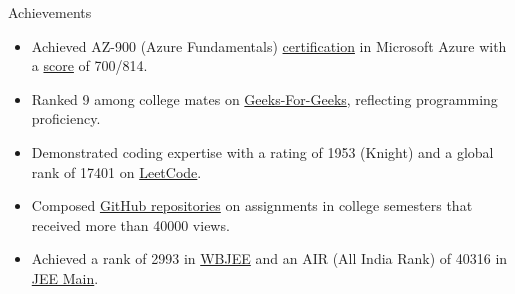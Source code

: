 \documentclass{resume} %
\begin{document}
\begin{rSection}{Achievements} 
\begin{itemize}
\setlength\itemsep{-1.75em} %
     \item Achieved AZ-900 (Azure Fundamentals) \href{https://learn.microsoft.com/en-in/users/arkapratimghosh-4932/credentials/certification-o-/azure-fundamentals}{certification} in Microsoft Azure with a \href{https://drive.google.com/file/d/1s7vbb-FW7VGSNXz2BCDkJnFmuanPQLEC/view}{score} of 700/814. \\
    \item   Ranked 9 among college mates on \href{https://www.geeksforgeeks.org/user/arkapratimghosh20021/?utm_source=geeksforgeeks&utm_medium=my_profile&utm_campaign=auth_user}{Geeks-For-Geeks}, reflecting programming proficiency. \\
    \item Demonstrated coding expertise with a rating of 1953 (Knight) and a global rank of 17401 on \href{https://leetcode.com/21Arka2002/}{LeetCode}. \\
    \item Composed \href{https://github.com/arkapg211002/TotalViewsProjectRepoReadme}{GitHub repositories} on assignments in college semesters that received more than 40000 views. \\
    \item Achieved a rank of 2993 in \href{https://drive.google.com/file/d/1xc6hvBjQhrxccVi4ENYZc62iL98IfvNh/view}{WBJEE} and an AIR (All India Rank) of 40316 in \href{https://drive.google.com/file/d/1xjdXfsoL_L62ij-P8jDuyyKQw9I1_Ht0/view}{JEE Main}.
\end{itemize}

% 

\end{rSection}




\end{document}
